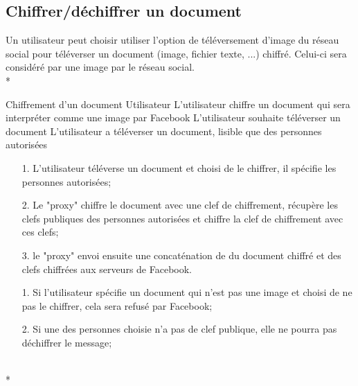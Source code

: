\documentclass[a4paper,11pt,french]{article}
\begin{document}
\subsection{Chiffrer/déchiffrer un document}
Un utilisateur peut choisir utiliser l'option de téléversement
d'image du réseau social pour téléverser un document (image, 
fichier texte, ...) chiffré. Celui-ci sera considéré par une image
par le réseau social.\\*

\fiche
	{Chiffrement d'un document}
	{Utilisateur}
	{L'utilisateur chiffre un document qui sera interpréter comme une image par Facebook}
	{}
	{L'utilisateur souhaite téléverser un document}
	{L'utilisateur a téléverser un document, lisible que des personnes autorisées}
	{\begin{itemize}
	    \item[]
	  \item[1.] L'utilisateur téléverse un document et choisi de le chiffrer,
          il spécifie les personnes autorisées;
	\end{itemize}
	}
	{\begin{itemize}
        \item[]
		\item[2.] Le "proxy" chiffre le document avec une clef 
        de chiffrement, récupère les clefs publiques
        des personnes autorisées et chiffre la clef de chiffrement
        avec ces clefs;
		\item[3.] le "proxy" envoi ensuite une concaténation de 
        du document chiffré et des clefs chiffrées aux serveurs de Facebook.
	\end{itemize}
	}
	{}
\flots
    {\begin{itemize}
    \item[]
    \item[1.] Si l'utilisateur spécifie un document qui n'est pas une image
    et choisi de ne pas le chiffrer, cela sera refusé par Facebook;
    \item[2.] Si une des personnes choisie n'a pas de clef publique,
        elle ne pourra pas déchiffrer le message;
    \end{itemize}
    }
	{}    
\\*
\end{document}
